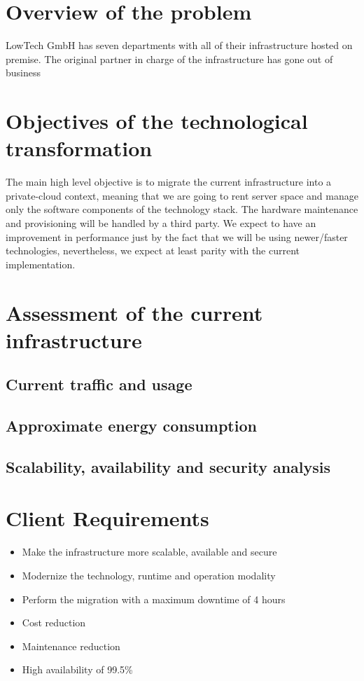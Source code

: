 \documentclass{llncs}
\begin{document}
\section{Overview of the problem}

LowTech GmbH has seven departments with all of their infrastructure hosted on premise. The original partner in charge of the infrastructure has gone out of business


\section{Objectives of the technological transformation}

The main high level objective is to migrate the current infrastructure into a private-cloud context, meaning that we are going to rent server space and manage only the software components of the technology stack. The hardware maintenance and provisioning will be handled by a third party. We expect to have an improvement in performance just by the fact that we will be using newer/faster technologies, nevertheless, we expect at least parity with the current implementation. 


\section{Assessment of the current infrastructure}

\subsection{Current traffic and usage}

\subsection{Approximate energy consumption}

\subsection{Scalability, availability and security analysis}




\section{Client Requirements}

\begin{itemize}
  \item Make the infrastructure more scalable, available and secure
  \item Modernize the technology, runtime and operation modality
  \item Perform the migration with a maximum downtime of 4 hours
  \item Cost reduction
  \item Maintenance reduction
  \item High availability of 99.5\%
\end{itemize}
\end{document}
